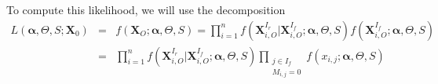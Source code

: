 \documentclass[12pt,a4paper]{report}
\begin{document}
To compute this likelihood, we will use the decomposition
\begin{eqnarray}
	L(\boldsymbol{\alpha},\Theta,S;\boldsymbol{X}_0)&=&f(\boldsymbol{X}_{O};\boldsymbol{\alpha},\Theta,S)=\prod_{i=1}^nf(\boldsymbol{X}^{I_r}_{i,O}|\boldsymbol{X}^{I_f}_{i,O};\boldsymbol{\alpha},\Theta,S)f(\boldsymbol{X}^{I_f}_{i,O};\boldsymbol{\alpha},\Theta,S) \\
	&=&\prod_{i=1}^nf(\boldsymbol{X}^{I_r}_{i,O}|\boldsymbol{X}^{I_f}_{i,O};\boldsymbol{\alpha},\Theta,S)\prod_{\substack{j \in I_f \\ M_{i,j}=0}}f(x_{i,j};\boldsymbol{\alpha},\Theta,S)
\end{eqnarray}
\end{document}
